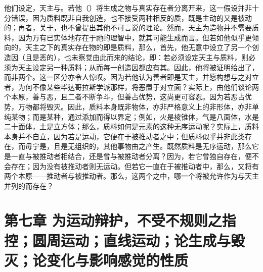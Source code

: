 他们设定，天主与。若他（）将生成之物与真实存在者分离开来，这一假设并非十分错误，因为质料既非自我创造，也不接受两种相反的质，既是主动的又是被动的；再者，关于，也不曾提出其他不可言说的理论。然而，天主为造物并不需要质料，因为万有已实体地存在于祂的理智中，就其可能生成而言。但若如他似乎更倾向的，天主之下的真实存在物的即是质料，那么，首先，他无意中设立了另一个创造因（且是恶的），也未察觉由此而来的结论，即：若必须设定天主与质料，则必须为天主设定另一种质料；从而每一创造因都应有其。因此，他将被证明给出了，而非两个。这一区分亦令人惊叹。因为若他认为善者即是天主，并愿构想与之对立者，为何不像某些毕达哥拉斯学派那样，将恶置于对立面？实际上，由他们谈论两个本原，善与恶，且二者不断争斗，但善占优势，这尚更可容忍。因为若恶占优势，万物都将毁灭。因此，质料本身既非物体，亦非严格意义上的非形体，亦非单纯某物；而是某种，通过添加而得以界定；例如，火是棱锥体，气是八面体，水是二十面体，土是立方体；那么，质料如何是元素的这种无序运动呢？实际上，质料本身并不自立，因为若是运动，它便在于被推动者之中；但质料似乎并非此类存在，而毋宁是，且是无组织的，其他事物由之产生。既然质料是无序运动，那么它是一直与被推动者相结合，还是曾与被推动者分离？因为，若它曾独自存在，便不会存在；因为没有被推动者则无运动。但若它一直在于被推动者中，那么，又将有两个本原——推动者与被推动者。那么，这两个之中，哪一个将被允许作为与天主并列的而存在？\par


\section{第七章 为运动辩护，不受不规则之指控；圆周运动；直线运动；论生成与毁灭；论变化与影响感觉的性质}

